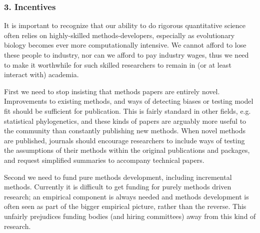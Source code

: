 \documentclass[a4paper,12pt]{article}
\begin{document}

  \subsubsection{3. Incentives}
    It is important to recognize that our ability to do rigorous quantitative science often relies on highly-skilled methods-developers, especially as evolutionary biology becomes ever more computationally intensive. 
    We cannot afford to lose these people to industry, nor can we afford to pay industry wages, thus we need to make it worthwhile for such skilled researchers to remain in (or at least interact with) academia.

    First we need to stop insisting that methods papers are entirely novel. 
    Improvements to existing methods, and ways of detecting biases or testing model fit should be sufficient for publication.
    This is fairly standard in other fields, e.g. statistical phylogenetics, and these kinds of papers are arguably more useful to the community than constantly publishing new methods.
    When novel methods are published, journals should encourage researchers to include ways of testing the assumptions of their methods within the original publications and packages, and request simplified summaries to accompany technical papers.

    Second we need to fund pure methods development, including incremental methods. 
    Currently it is difficult to get funding for purely methods driven research; an empirical component is always needed and methods development is often seen as part of the bigger empirical picture, rather than the reverse. 
    This unfairly prejudices funding bodies (and hiring committees) away from this kind of research. 
\end{document}
